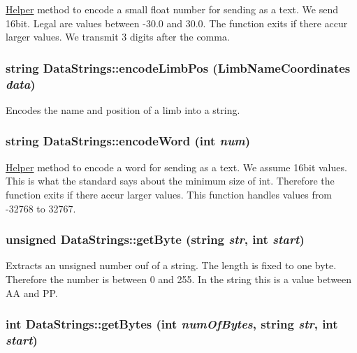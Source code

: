 \label{classDataStrings_a416919ab32b17ec1ded450e5e80fb05f}
\hyperlink{classHelper}{Helper} method to encode a small float number for sending as a text. We send 16bit. Legal are values between -\/30.0 and 30.0. The function exits if there accur larger values. We transmit 3 digits after the comma. \hypertarget{classDataStrings_a822ab320fceb49de214ba804860e21e4}{
\subsubsection[{encodeLimbPos}]{\setlength{\rightskip}{0pt plus 5cm}string DataStrings::encodeLimbPos ({\bf LimbNameCoordinates} {\em data})}}
\label{classDataStrings_a822ab320fceb49de214ba804860e21e4}
Encodes the name and position of a limb into a string. \hypertarget{classDataStrings_a6f006e5be30be2bed7964aed0586d38f}{
\subsubsection[{encodeWord}]{\setlength{\rightskip}{0pt plus 5cm}string DataStrings::encodeWord (int {\em num})}}
\label{classDataStrings_a6f006e5be30be2bed7964aed0586d38f}
\hyperlink{classHelper}{Helper} method to encode a word for sending as a text. We assume 16bit values. This is what the standard says about the minimum size of int. Therefore the function exits if there accur larger values. This function handles values from -\/32768 to 32767. \hypertarget{classDataStrings_a7e07a327b93e74d5b320ef0485db7a89}{
\subsubsection[{getByte}]{\setlength{\rightskip}{0pt plus 5cm}unsigned DataStrings::getByte (string {\em str}, \/  int {\em start})}}
\label{classDataStrings_a7e07a327b93e74d5b320ef0485db7a89}
Extracts an unsigned number ouf of a string. The length is fixed to one byte. Therefore the number is between 0 and 255. In the string this is a value between AA and PP. \hypertarget{classDataStrings_a966c13fc690343dbe1022efaa0d64361}{
\subsubsection[{getBytes}]{\setlength{\rightskip}{0pt plus 5cm}int DataStrings::getBytes (int {\em numOfBytes}, \/  string {\em str}, \/  int {\em start})}}
